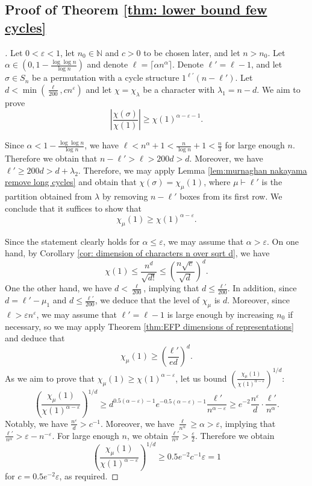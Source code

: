 \documentclass[11pt, letterpaper]{amsart}
\newcommand\eps{\varepsilon}
\renewcommand\ge{\geqslant}
\renewcommand\le{\leqslant}
\renewcommand{\epsilon}{\eps}
\newcommand{\NN}{\mathbb{N}}
\begin{document}
\subsection{Proof of Theorem \ref{thm: lower bound few cycles}}
\begin{proof}[\unskip\nopunct]
Let $0 < \epsilon < 1$, let $n_0 \in \NN$ and $c>0$ to be chosen later, and let $n>n_0$. Let $\alpha\in(0,1-\frac{\log\log n}{\log n})$ and denote $\ell=\lceil\alpha n^{\alpha}\rceil$. Denote $\ell' = \ell-1$, and let $\sigma \in S_n$ be a permutation with a cycle structure $1^{\ell'}(n-\ell')$. Let $d < \min(\frac{\ell}{200},cn^\epsilon)$ and let $\chi = \chi_\lambda$ be a character with $\lambda_1=n-d$. We aim to prove
\[
    \left|\frac{\chi(\sigma)}{\chi(1)}\right|\ge\chi(1)^{\alpha-\epsilon-1}.
\]

Since $\alpha < 1-\frac{\log\log n}{\log n}$, we have $\ell < n^\alpha+1 < \frac{n}{\log n}+1 < \frac{n}{3}$ for large enough $n$. Therefore we obtain that $n-\ell' >\ell > 200d > d$. Moreover, we have $\ell' \ge 200d >d+\lambda_2$. Therefore, we may apply Lemma \ref{lem:murnaghan nakayama remove long cycles} and obtain that $\chi(\sigma)=\chi_{\mu}(1)$, where $\mu \vdash \ell'$ is the partition obtained from $\lambda$ by removing $n-\ell'$ boxes from its first row. We conclude that it suffices to show that
\[
    \chi_\mu(1)\ge\chi(1)^{\alpha-\epsilon}.
\]

Since the statement clearly holds for $\alpha \le \epsilon$, we may assume that $\alpha > \epsilon$. On one hand, by Corollary \ref{cor: dimension of characters n over sqrt d}, we have
\[
    \chi(1)\le\frac{n^{d}}{\sqrt{d!}}\le\left(\frac{n\sqrt{e}}{\sqrt{d}}\right)^{d}.
\]
One the other hand, we have $d < \frac{\ell}{200}$, implying that $d \le \frac{\ell'}{200}$. In addition, since $d=\ell'-\mu_1$ and $d \le \frac{\ell'}{200}$, we deduce that the level of $\chi_\mu$ is $d$. Moreover, since $\ell > \epsilon n^\epsilon$, we may assume that $\ell'=\ell-1$ is large enough by increasing $n_0$ if necessary, so we may apply Theorem \ref{thm:EFP dimensions of representations} and deduce that
\[
    \chi_{\mu}(1)\ge\left(\frac{\ell'}{ed}\right)^{d}.
\]
As we aim to prove that $\chi_\mu(1)\ge\chi(1)^{\alpha-\epsilon}$, let us bound $\left(\frac{\chi_{\mu}(1)}{\chi(1)^{\alpha-\epsilon}}\right)^{1/d}$:
\[
    \left(\frac{\chi_{\mu}(1)}{\chi(1)^{\alpha-\epsilon}}\right)^{1/d}\ge d^{0.5(\alpha-\epsilon)-1}e^{-0.5(\alpha-\epsilon)-1}\frac{\ell'}{n^{\alpha-\epsilon}} \ge e^{-2}\frac{n^\epsilon}{d}\cdot \frac{\ell'}{n^{\alpha}}.
\]
Notably, we have $\frac{n^\epsilon}{d} > c^{-1}$. Moreover, we have $\frac{\ell}{n^\alpha} \ge \alpha > \epsilon$, implying that $\frac{\ell'}{n^\alpha} > \epsilon-n^{-\epsilon}$. For large enough $n$, we obtain $\frac{\ell'}{n^\alpha} > \frac{\epsilon}{2}$. Therefore we obtain
\[
    \left(\frac{\chi_{\mu}(1)}{\chi(1)^{\alpha-\epsilon}}\right)^{1/d} \ge 0.5e^{-2}c^{-1}\epsilon = 1
\]
for $c = 0.5e^{-2}\epsilon$, as required.
\end{proof}
\end{document}
